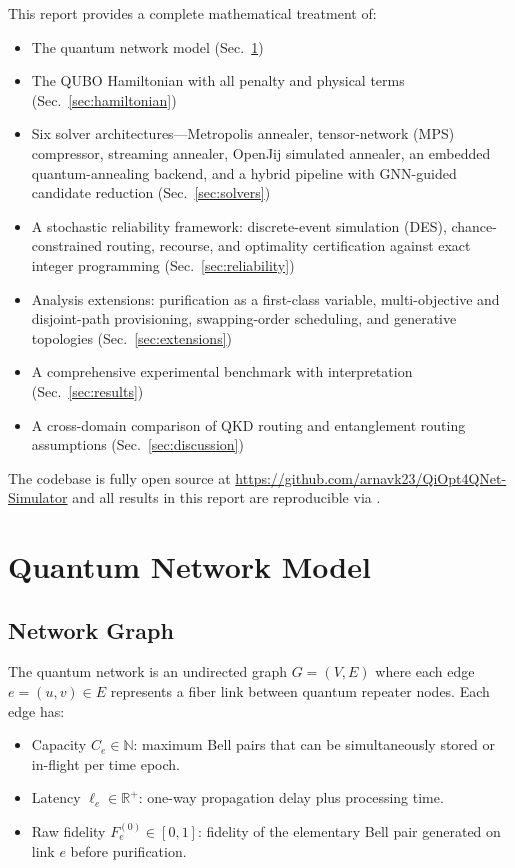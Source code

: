 \documentclass[10pt,a4paper]{article}
\newcommand{\R}{\mathbb{R}}
\newcommand{\N}{\mathbb{N}}
\begin{document}
This report provides a complete mathematical treatment of:
\begin{itemize}
  \item The quantum network model (Sec.~\ref{sec:model})
  \item The QUBO Hamiltonian with all penalty and physical terms
    (Sec.~\ref{sec:hamiltonian})
  \item Six solver architectures---Metropolis annealer,
    tensor-network (MPS) compressor, streaming annealer, OpenJij
    simulated annealer, an embedded quantum-annealing backend, and a
    hybrid pipeline with GNN-guided candidate reduction
    (Sec.~\ref{sec:solvers})
  \item A stochastic reliability framework: discrete-event simulation
    (DES), chance-constrained routing, recourse, and optimality
    certification against exact integer programming
    (Sec.~\ref{sec:reliability})
  \item Analysis extensions: purification as a first-class variable,
    multi-objective and disjoint-path provisioning, swapping-order
    scheduling, and generative topologies (Sec.~\ref{sec:extensions})
  \item A comprehensive experimental benchmark with interpretation
    (Sec.~\ref{sec:results})
  \item A cross-domain comparison of QKD routing and entanglement
    routing assumptions (Sec.~\ref{sec:discussion})
\end{itemize}

The codebase is fully open source at
\url{https://github.com/arnavk23/QiOpt4QNet-Simulator} and all results
in this report are reproducible via .

\section{Quantum Network Model}
\label{sec:model}

\subsection{Network Graph}

The quantum network is an undirected graph $G = (V, E)$ where each
edge $e = (u,v) \in E$ represents a fiber link between quantum
repeater nodes.  Each edge has:
\begin{itemize}
  \item Capacity $C_e \in \N$: maximum Bell pairs that can be
    simultaneously stored or in-flight per time epoch.
  \item Latency $\ell_e \in \R^+$: one-way propagation delay plus
    processing time.
  \item Raw fidelity $F_e^{(0)} \in [0,1]$: fidelity of the
    elementary Bell pair generated on link $e$ before purification.
\end{itemize}
\end{document}
